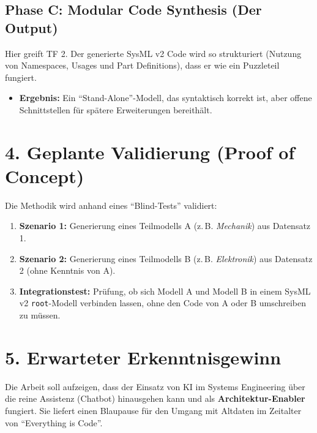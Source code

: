 \documentclass[a4paper,11pt]{article}
\begin{document}
\subsection*{Phase C: Modular Code Synthesis (Der Output)}
Hier greift TF 2. Der generierte SysML v2 Code wird so strukturiert (Nutzung von Namespaces, Usages und Part Definitions), dass er wie ein Puzzleteil fungiert.
\begin{itemize}
    \item \textbf{Ergebnis:} Ein \enquote{Stand-Alone}-Modell, das syntaktisch korrekt ist, aber offene Schnittstellen für spätere Erweiterungen bereithält.
\end{itemize}

\section{4. Geplante Validierung (Proof of Concept)}

Die Methodik wird anhand eines \enquote{Blind-Tests} validiert:
\begin{enumerate}
    \item \textbf{Szenario 1:} Generierung eines Teilmodells A (z.\,B. \textit{Mechanik}) aus Datensatz 1.
    \item \textbf{Szenario 2:} Generierung eines Teilmodells B (z.\,B. \textit{Elektronik}) aus Datensatz 2 (ohne Kenntnis von A).
    \item \textbf{Integrationstest:} Prüfung, ob sich Modell A und Modell B in einem SysML v2 \texttt{root}-Modell verbinden lassen, ohne den Code von A oder B umschreiben zu müssen.
\end{enumerate}

\section{5. Erwarteter Erkenntnisgewinn}

Die Arbeit soll aufzeigen, dass der Einsatz von KI im Systems Engineering über die reine Assistenz (Chatbot) hinausgehen kann und als \textbf{Architektur-Enabler} fungiert. Sie liefert einen Blaupause für den Umgang mit Altdaten im Zeitalter von \enquote{Everything is Code}.
\end{document}
